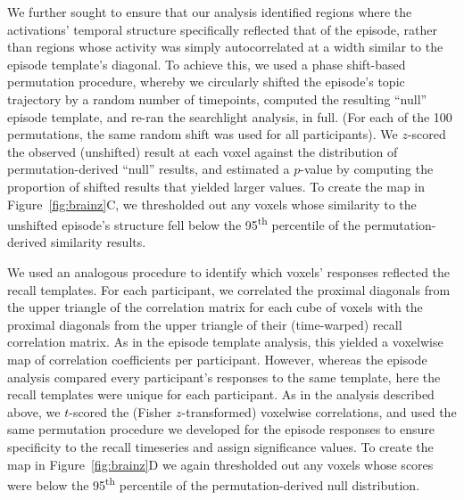 \documentclass{article}
\begin{document}
We further sought to ensure that our analysis identified regions where the activations’ temporal structure specifically reflected that of the episode, rather than regions whose activity was simply autocorrelated at a width similar to the episode template’s diagonal.  To achieve this, we used a phase shift-based permutation procedure, whereby we circularly shifted the episode’s topic trajectory by a random number of timepoints, computed the resulting ``null” episode template, and re-ran the searchlight analysis, in full.  (For each of the 100 permutations, the same random shift was used for all participants).  We $z$-scored the observed (unshifted) result at each voxel against the distribution of permutation-derived ``null” results, and estimated a $p$-value by computing the proportion of shifted results that yielded larger values.  To create the map in Figure~\ref{fig:brainz}C, we thresholded out any voxels whose similarity to the unshifted episode’s structure fell below the 95\textsuperscript{th} percentile of the permutation-derived similarity results.

We used an analogous procedure to identify which voxels' responses reflected the recall templates.  For each participant, we correlated the proximal diagonals from the upper triangle of the correlation matrix for each cube of voxels with the proximal diagonals from the upper triangle of their (time-warped) recall correlation matrix.  As in the episode template analysis, this yielded a voxelwise map of correlation coefficients per participant.  However, whereas the episode analysis compared every participant's responses to the same template, here the recall templates were unique for each participant.  As in the analysis described above, we $t$-scored the (Fisher $z$-transformed) voxelwise correlations, and used the same permutation procedure we developed for the episode responses to ensure specificity to the recall timeseries and assign significance values.  To create the map in Figure~\ref{fig:brainz}D we again thresholded out any voxels whose scores were below the 95\textsuperscript{th} percentile of the permutation-derived null distribution.
\end{document}
